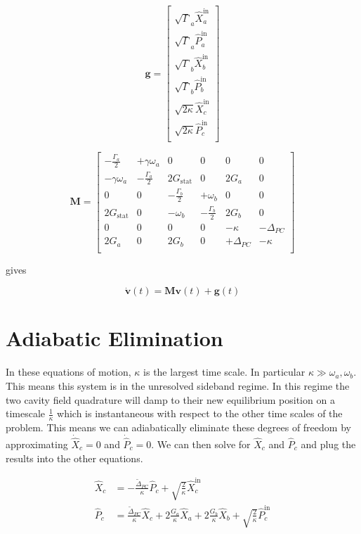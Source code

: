 \documentclass[12pt]{article}
\begin{document}
\begin{equation}
\textbf{g} = \begin{bmatrix}
\sqrt{\Gamma}_a \hat{X}_a^{\text{in}}\\
\sqrt{\Gamma}_a \hat{P}_a^{\text{in}}\\
\sqrt{\Gamma}_b \hat{X}_b^{\text{in}}\\
\sqrt{\Gamma}_b \hat{P}_b^{\text{in}}\\
\sqrt{2\kappa} \hat{X}_c^{\text{in}}\\
\sqrt{2\kappa} \hat{P}_c^{\text{in}}\\
\end{bmatrix}
\end{equation}

\[ \textbf{M} = \begin{bmatrix}
-\frac{\Gamma_a}{2} & +\gamma \omega_a & 0 & 0 & 0 & 0 \\
-\gamma \omega_a & -\frac{\Gamma_a}{2} & 2G_{\text{stat}} & 0 & 2G_a & 0 \\
0 & 0 & -\frac{\Gamma_b}{2} & +\omega_b & 0 & 0 \\
2G_{\text{stat}} & 0 & -\omega_b & -\frac{\Gamma_b}{2} & 2G_b & 0\\
0 & 0 & 0 & 0 & -\kappa & -\Delta_{PC} \\
2G_a & 0 & 2G_b & 0 & +\Delta_{PC} & -\kappa \\ \end{bmatrix}\]

gives

\[
\dot{\textbf{v}}(t) = \textbf{M} \textbf{v}(t) + \textbf{g}(t)
\]

\section{Adiabatic Elimination}

In these equations of motion, $\kappa$ is the largest time scale. In particular $\kappa \gg \omega_a, \omega_b$. This means this system is in the unresolved sideband regime. In this regime the two cavity field quadrature will damp to their new equilibrium position on a timescale $\frac{1}{\kappa}$ which is instantaneous with respect to the other time scales of the problem. This means we can adiabatically eliminate these degrees of freedom by approximating $\dot{\hat{X}}_c =0$ and $\dot{\hat{P}}_c = 0$. We can then solve for $\hat{X}_c$ and $\hat{P}_c$ and plug the results into the other equations.

\begin{align}
\hat{X}_c &= -\frac{\tilde{\Delta}_{PC}}{\kappa} \hat{P}_c + \sqrt{\frac{2}{\kappa}}\hat{X}_c^{\text{in}}\\
\hat{P}_c &= \frac{\tilde{\Delta}_{PC}}{\kappa} \hat{X}_c + 2\frac{G_a}{\kappa}\hat{X}_a + 2\frac{G_b}{\kappa} \hat{X}_b + \sqrt{\frac{2}{\kappa}}\hat{P}_c^{\text{in}}
\end{align}
\end{document}
